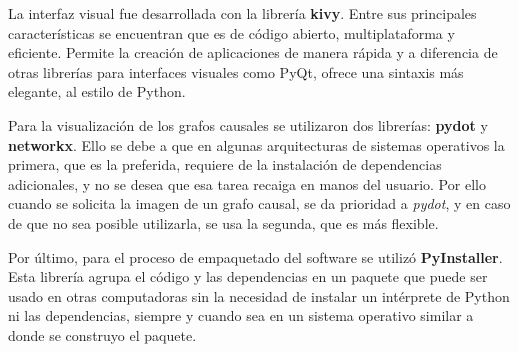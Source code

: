 La interfaz visual fue desarrollada con la librería \textbf{kivy}\cite{kivyDocs}. Entre sus principales características se encuentran que es de código abierto, multiplataforma y eficiente. Permite la creación de aplicaciones de manera rápida y a diferencia de otras librerías para interfaces visuales como PyQt, ofrece una sintaxis más elegante, al estilo de Python.

Para la visualización de los grafos causales se utilizaron dos librerías: \textbf{pydot}\cite{pydotDocs} y \textbf{networkx}\cite{networkxDocs}. Ello se debe a que en algunas arquitecturas de sistemas operativos la primera, que es la preferida, requiere de la instalación de dependencias adicionales, y no se desea que esa tarea recaiga en manos del usuario. Por ello cuando se solicita la imagen de un grafo causal, se da prioridad a \textit{pydot}, y en caso de que no sea posible utilizarla, se usa la segunda, que es más flexible.

Por último, para el proceso de empaquetado del software se utilizó \textbf{PyInstaller}\cite{PyInstaller}. Esta librería agrupa el código y las dependencias en un paquete que puede ser usado en otras computadoras sin la necesidad de instalar un intérprete de Python ni las dependencias, siempre y cuando sea en un sistema operativo similar a donde se construyo el paquete.

